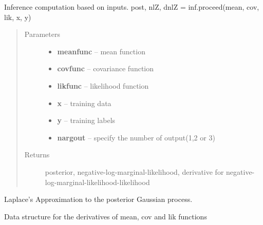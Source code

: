 \documentclass[letterpaper,10pt,english]{sphinxmanual}
\begin{document}
\begin{fulllineitems}
\begin{fulllineitems}
\label{Likelihoods:pyGPs.Core.inf.Inference.proceed}
Inference computation based on inputs.
post, nlZ, dnlZ = inf.proceed(mean, cov, lik, x, y)
\begin{quote}\begin{description}
\item[{Parameters}] \leavevmode\begin{itemize}
\item {} 
\textbf{meanfunc} -- mean function

\item {} 
\textbf{covfunc} -- covariance function

\item {} 
\textbf{likfunc} -- likelihood function

\item {} 
\textbf{x} -- training data

\item {} 
\textbf{y} -- training labels

\item {} 
\textbf{nargout} -- specify the number of output(1,2 or 3)

\end{itemize}

\item[{Returns}] \leavevmode
posterior, negative-log-marginal-likelihood, derivative for negative-log-marginal-likelihood-likelihood

\end{description}\end{quote}

\end{fulllineitems}


\end{fulllineitems}


\begin{fulllineitems}
\label{Likelihoods:pyGPs.Core.inf.Laplace}
Laplace's Approximation to the posterior Gaussian process.

\end{fulllineitems}


\begin{fulllineitems}
\label{Likelihoods:pyGPs.Core.inf.dnlZStruct}
Data structure for the derivatives of mean, cov and lik functions

\end{fulllineitems}
\end{document}

